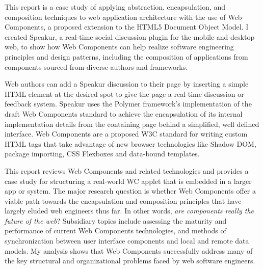 \documentclass[12pt]{report}	%
\theoremstyle{definition}
\theoremstyle{remark}
\begin{document}
This report is a case study of applying abstraction, encapsulation, and composition techniques to web application architecture with the use of Web Components, 
a proposed extension to the HTML5 Document Object Model. 
I created Speakur, a real-time social discussion plugin for the mobile and desktop web, 
to show how Web Components can help realize software engineering principles and design patterns, including the composition of applications from components sourced from diverse authors and frameworks.

Web authors can add a Speakur discussion to their page by inserting a simple HTML element at the desired spot to give the page a real-time discussion or feedback system.
Speakur uses the Polymer framework's implementation of the draft Web Components standard to achieve the encapsulation of its internal implementation details from the containing page behind a simplified, well defined interface.
Web Components are a proposed W3C standard for writing custom HTML tags that take advantage of new browser technologies like Shadow DOM, package importing, CSS Flexboxes and data-bound templates.

This report reviews Web Components and related technologies and provides a case study for structuring a real-world WC applet that is embedded in a larger app or system.
The major research question is whether Web Components offer a viable path towards the encapsulation and composition principles that have largely eluded web engineers thus far. 
In other words, \textit{are components really the future of the web}? 
Subsidiary topics include assessing the maturity and performance of current Web Components technologies,
and methods of synchronization between user interface components and local and remote data models.
My analysis shows that Web Components successfully address many of the key structural and organizational problems faced by web software engineers.

\tableofcontents   %

\listoftables      %
\listoffigures     %
\lstlistoflistings


%
%

\end{document}
